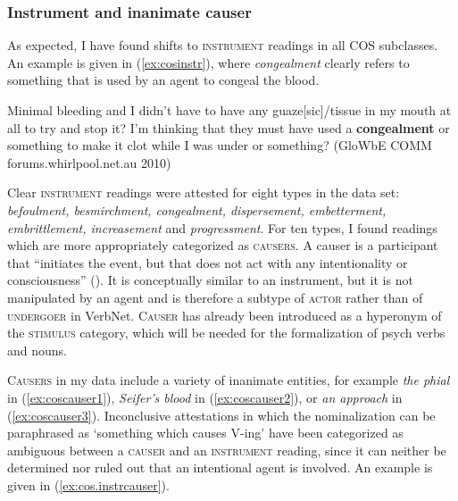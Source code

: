 \subsubsection{{Instrument and inanimate causer}}
\label{sec:cos-output-survey-instrument}

As expected, I have found shifts to \textsc{instrument} readings in all COS subclasses.
An example is given in (\ref{ex:cosinstr}), where \textit{congealment} clearly refers to something that is used by an agent to congeal the blood.

\begin{exe}
  \ex \label{ex:cosinstr} Minimal bleeding and I didn't have to have any guaze[sic]/tissue in my mouth at all to try and stop it? I'm thinking that they must have used a \textbf{congealment} or something to make it clot while I was under or something? {\small(\acs{GloWbE} COMM forums.whirlpool.net.au 2010)}
\end{exe}

\noindent Clear \textsc{instrument} readings were attested for eight types in the data set: \textit{befoulment, besmirchment, congealment, dispersement, embetterment, embrittlement, increasement} and \textit{progressment}. For ten types, I found readings which are more appropriately categorized as \textsc{causers}. A causer is a participant that ``initiates the event, but that does not act with any intentionality or consciousness'' (\citealt[317]{Palmer.2017}). It is conceptually similar to an instrument, but it is not manipulated by an agent and is therefore a subtype of \textsc{actor} rather than of \textsc{undergoer} in VerbNet. \textsc{Causer} has already been introduced as a hyperonym of the \textsc{stimulus} category, which will be needed for the formalization of psych verbs and nouns. 

\textsc{Causers} in my data include a variety of inanimate entities, for example \textit{the phial} in (\ref{ex:coscauser1}), \textit{Seifer's blood} in (\ref{ex:coscauser2}), or \textit{an approach} in (\ref{ex:coscauser3}). Inconclusive attestations in which the nominalization can be paraphrased as `something which causes V-ing' have been categorized as ambiguous between a \textsc{causer} and an \textsc{instrument} reading, since it can neither be determined nor ruled out that an intentional agent is involved. An example is given in (\ref{ex:cos.instrcauser}). 

